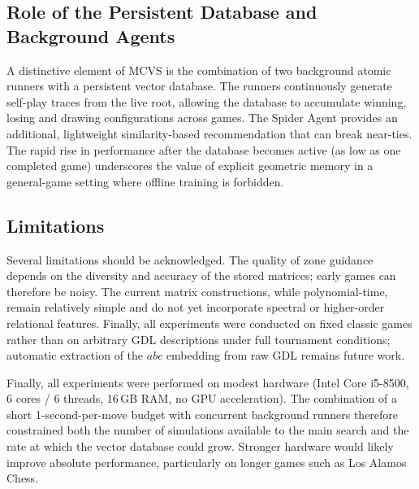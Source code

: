 \documentclass[11pt,a4paper]{article}
\theoremstyle{plain}
\theoremstyle{definition}
\begin{document}
\vspace{0.5em}

\subsection{Role of the Persistent Database and Background Agents}

\vspace{0.5em}

A distinctive element of MCVS is the combination of two background atomic runners with a persistent vector database. The runners continuously generate self-play traces from the live root, allowing the database to accumulate winning, losing and drawing configurations across games. The Spider Agent provides an additional, lightweight similarity-based recommendation that can break near-ties. The rapid rise in performance after the database becomes active (as low as one completed game) underscores the value of explicit geometric memory in a general-game setting where offline training is forbidden.

\vspace{0.5em}

\subsection{Limitations}

\vspace{0.5em}

Several limitations should be acknowledged. The quality of zone guidance depends on the diversity and accuracy of the stored matrices; early games can therefore be noisy. The current matrix constructions, while polynomial-time, remain relatively simple and do not yet incorporate spectral or higher-order relational features. Finally, all experiments were conducted on fixed classic games rather than on arbitrary GDL descriptions under full tournament conditions; automatic extraction of the \(abc\) embedding from raw GDL remains future work.

\vspace{0.5em}

Finally, all experiments were performed on modest hardware (Intel Core i5-8500, 
6 cores / 6 threads, 16\,GB RAM, no GPU acceleration). The combination of a short 
1-second-per-move budget with concurrent background runners therefore constrained 
both the number of simulations available to the main search and the rate at which 
the vector database could grow. Stronger hardware would likely improve absolute 
performance, particularly on longer games such as Los Alamos Chess.
\end{document}
